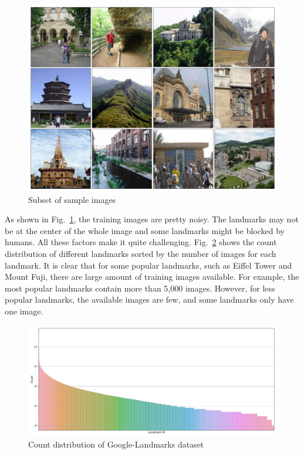 \documentclass[final,3p]{elsarticle}
\begin{document}
\begin{figure}[hbtp]
\centering\includegraphics[width=0.94\linewidth]{./figures/sample.png}
\caption{Subset of sample images}
\label{fig:sample}
\end{figure}

As shown in Fig.~\ref{fig:sample}, the training images are pretty noisy. The landmarks may not be at the center of the whole image and some landmarks might be blocked by humans. All these factors make it quite challenging. Fig.~\ref{fig:all_distribution} shows the count distribution of different landmarks sorted by the number of images for each landmark. It is clear that for some popular landmarks, such as Eiffel Tower and Mount Fuji, there are large amount of training images available. For example, the most popular landmarks contain more than 5,000 images. However, for less popular landmarks, the available images are few, and some landmarks only have one image. 

\begin{figure}[htbp]
\centering\includegraphics[width=1.0\linewidth]{./figures/all_distribution.png}
\caption{Count distribution of Google-Landmarks dataset}
\label{fig:all_distribution}
\end{figure}
\end{document}
